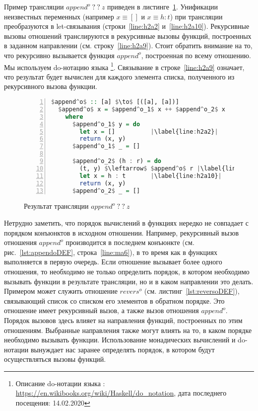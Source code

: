 \documentclass[conference,american,russian]{IEEEtran}
\begin{document}
Пример трансляции $append^o \ ? \ ? \ z$ приведен в листинге~\ref{lst:appendoBWD}.  
Унификации неизвестных переменных (например $x \equiv []$ и $x \equiv h : t$) при трансляции преобразуются в let-связывания (строки~\ref{line:h2a2} и~\ref{line:h2a10}). 
Рекурсивные вызовы отношений транслируются в рекурсивные вызовы функций, построенных в заданном направлении (см. строку~\ref{line:h2a9}).
Стоит обратить внимание на то, что рекурсивно вызывается функция $append^o$, построенная по всему отношению.
Мы используем do-нотацию языка \haskell{}\footnote{Описание do-нотации языка \haskell{}: \url{https://en.wikibooks.org/wiki/Haskell/do\_notation}, дата последнего посещения: 14.02.2020}.
Связывание в строке~\ref{line:h2a9} означает, что результат будет вычислен для каждого элемента списка, полученного из рекурсивного вызова функции.

\begin{figure}[h!]
  \begin{center}
  \begin{minipage}{0.4\textwidth}
    \begin{lstlisting}[language=Haskell, frame=single, numbers=left,numberstyle=\small, escapechar=|]
  $append^o$ :: [a] $\to$ [([a], [a])]
  $append^o$ x = $append^o_1$ x ++ $append^o_2$ x
    where
      $append^o_1$ y = do
        let x = []          |\label{line:h2a2}|
        return (x, y)
      $append^o_1$ _ = []
      
      $append^o_2$ (h : r) = do
        (t, y) $\leftarrow$ $append^o$ r |\label{line:h2a9}|
        let x = h : t       |\label{line:h2a10}|
        return (x, y)
      $append^o_2$ _ = []
      \end{lstlisting}
  \end{minipage}
  \end{center}
  \caption{Результат трансляции $append^o \ ? \ ? \ z$ }
  \label{lst:appendoBWD}
\end{figure}

Нетрудно заметить, что порядок вычислений в функциях нередко не совпадает с порядком конъюнктов в исходном отношении. 
Например, рекурсивный вызов отношения $append^o$ производится в последнем конъюнкте (см. рис.~\ref{lst:appendoDEF}, строка~\ref{line:ma6}), в то время как в функциях выполняется в первую очередь. 
Если отношение вызывает более одного отношения, то необходимо не только определить порядок, в котором необходимо вызывать функции в результате трансляции, но и в каком направлении это делать. 
Примером может служить отношение $revers^o$ (см. листинг~\ref{lst:reversoDEF}), связывающий список со списком его элементов в обратном порядке.
Это отношение имеет рекурсивный вызов, а также вызов отношения $append^o$. 
Порядок вызовов здесь влияет на направления функций, построенных по этим отношениям.
Выбранные направления также могут влиять на то, в каком порядке необходимо вызывать функции. 
Использование монадических вычислений и do-нотации вынуждает нас заранее определять порядок, в котором будут осуществляться вызовы функций. 
\end{document}
